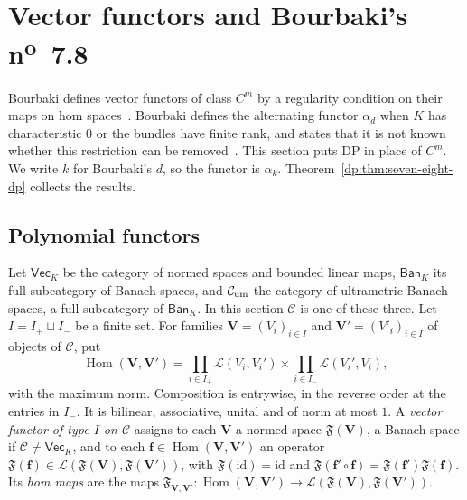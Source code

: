 \documentclass[11pt]{amsart}
\theoremstyle{definition}
\theoremstyle{remark}
\numberwithin{equation}{section}
\newcommand{\cL}{\mathcal L}
\newcommand{\id}{\mathrm{id}}
\newcommand{\cC}{\mathcal{C}}
\theoremstyle{plain}
\theoremstyle{definition}
\theoremstyle{plain}
\begin{document}
\section{Vector functors and Bourbaki's \texorpdfstring{n\textsuperscript{o}~7.8}{no. 7.8}}\label{dp:sec:functors}

Bourbaki defines vector functors of class $C^m$ by a regularity condition on their maps on hom spaces~\cite[n\textsuperscript{o}~7.6.1]{Bou}. Bourbaki defines the alternating functor $\alpha_d$ when $K$ has characteristic $0$ or the bundles have finite rank, and states that it is not known whether this restriction can be removed~\cite[n\textsuperscript{o}~7.8]{Bou}. This section puts DP in place of $C^m$. We write $k$ for Bourbaki's $d$, so the functor is $\alpha_k$. Theorem~\ref{dp:thm:seven-eight-dp} collects the results.

\subsection{Polynomial functors}

Let $\mathsf{Vec}_K$ be the category of normed spaces and bounded linear maps, $\mathsf{Ban}_K$ its full subcategory of Banach spaces, and $\cC_{\rm um}$ the category of ultrametric Banach spaces, a full subcategory of $\mathsf{Ban}_K$. In this section $\cC$ is one of these three. Let $I=I_+\sqcup I_-$ be a finite set. For families $\mathbf V=(V_i)_{i\in I}$ and $\mathbf V'=(V'_i)_{i\in I}$ of objects of $\cC$, put
\[
 \operatorname{Hom}(\mathbf V,\mathbf V')=\prod_{i\in I_+}\cL(V_i,V_i')\times\prod_{i\in I_-}\cL(V_i',V_i),
\]
with the maximum norm. Composition is entrywise, in the reverse order at the entries in $I_-$. It is bilinear, associative, unital and of norm at most $1$. A \emph{vector functor of type $I$ on $\cC$} assigns to each $\mathbf V$ a normed space $\mathfrak F(\mathbf V)$, a Banach space if $\cC\ne\mathsf{Vec}_K$, and to each $\mathbf f\in\operatorname{Hom}(\mathbf V,\mathbf V')$ an operator $\mathfrak F(\mathbf f)\in\cL(\mathfrak F(\mathbf V),\mathfrak F(\mathbf V'))$, with $\mathfrak F(\id)=\id$ and $\mathfrak F(\mathbf f'\circ\mathbf f)=\mathfrak F(\mathbf f')\mathfrak F(\mathbf f)$. Its \emph{hom maps} are the maps $\mathfrak F_{\mathbf V,\mathbf V'}\colon\operatorname{Hom}(\mathbf V,\mathbf V')\to\cL(\mathfrak F(\mathbf V),\mathfrak F(\mathbf V'))$.
\end{document}
